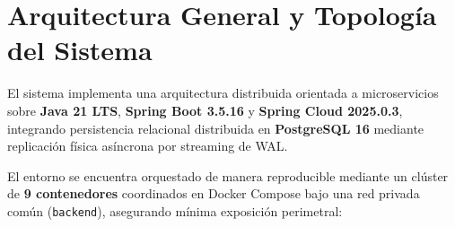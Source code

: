 \documentclass[12pt,a4paper]{article}
\begin{document}
\begin{titlepage}
\vspace{0.8cm}

\end{titlepage}

\clearpage
{}
\setcounter{page}{1}

\section{Arquitectura General y Topolog\'{i}a del Sistema}

El sistema implementa una arquitectura distribuida orientada a microservicios sobre \textbf{Java 21 LTS}, \textbf{Spring Boot 3.5.16} y \textbf{Spring Cloud 2025.0.3}, integrando persistencia relacional distribuida en \textbf{PostgreSQL 16} mediante replicaci\'{o}n f\'{i}sica as\'{i}ncrona por streaming de WAL.

El entorno se encuentra orquestado de manera reproducible mediante un cl\'{u}ster de \textbf{9 contenedores} coordinados en Docker Compose bajo una red privada com\'{u}n (\texttt{backend}), asegurando m\'{i}nima exposici\'{o}n perimetral:
\end{document}
